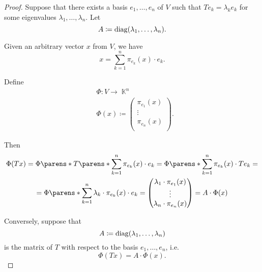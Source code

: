 \begin{proof}
   Suppose that there exists a basis \( e_1, \ldots, e_n \) of \( V \) such that \( Te_k = \lambda_k e_k \) for some eigenvalues \( \lambda_1, \ldots, \lambda_n \). Let
  \begin{equation*}
    A \coloneqq \operatorname{diag}(\lambda_1, \ldots, \lambda_n).
  \end{equation*}

  Given an arbitrary vector \( x \) from \( V \), we have
  \begin{equation*}
    x = \sum_{k=1}^n \pi_{e_k}(x) \cdot e_k.
  \end{equation*}

  Define
  \begin{equation*}
    \begin{aligned}
      &\Phi: V \to \BbbK^n \\
      &\Phi(x) \coloneqq \begin{pmatrix}
        \pi_{e_1}(x) \\
        \vdots \\
        \pi_{e_n}(x) \\
      \end{pmatrix}.
    \end{aligned}
  \end{equation*}

  Then
  \begin{multline*}
    \Phi(T x)
    =
    \Phi\parens*{ T \parens*{ \sum_{k=1}^n \pi_{e_k}(x) \cdot e_k } }
    =
    \Phi\parens*{ \sum_{k=1}^n \pi_{e_k}(x) \cdot T e_k }
    = \\ =
    \Phi\parens*{ \sum_{k=1}^n \lambda_k \cdot \pi_{e_k}(x) \cdot e_k }
    =
    \begin{pmatrix}
      \lambda_1 \cdot \pi_{e_1}(x) \\
      \vdots \\
      \lambda_n \cdot \pi_{e_n}(x)
    \end{pmatrix}
    =
    A \cdot \Phi(x)
  \end{multline*}

   Conversely, suppose that
  \begin{equation*}
    A \coloneqq \operatorname{diag}(\lambda_1, \ldots, \lambda_n)
  \end{equation*}
  is the matrix of \( T \) with respect to the basis \( e_1, \ldots, e_n \), i.e.
  \begin{equation*}
    \Phi(T x) = A \cdot \Phi(x).
  \end{equation*}


\end{proof}
